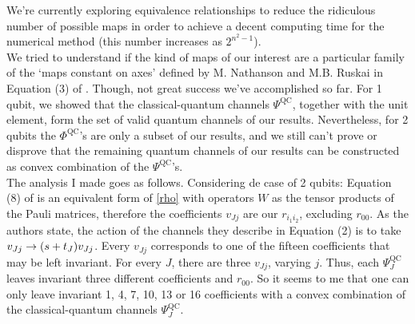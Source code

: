 \documentclass[11pt]{article}
\begin{document}
We're currently exploring equivalence relationships to reduce the ridiculous number of possible maps in order to achieve a
decent computing time for the numerical method (this number increases as $2^{n^2-1}$). \\ 

We tried to understand if the kind of maps of our interest are a particular family of the `maps constant on axes' defined by M.
Nathanson and M.B. Ruskai in Equation (3) of \cite{nathanson2007pauli}. Though, not great success we've accomplished so far.
For 1 qubit, we showed that the classical-quantum channels $\Psi ^{\text{QC}}$, together with the unit element, form the set
of valid quantum channels of our results. Nevertheless, for 2 qubits the $\Phi ^{\text{QC}}$'s are only a subset of our results,
and we still can't prove or disprove that the remaining quantum channels of our results can be constructed as convex
combination of the $\Psi ^{\text{QC}}$'s.\\

The analysis I made goes as follows. Considering de case of 2 qubits: Equation (8) of \cite{nathanson2007pauli} is an
equivalent form of \eqref{rho} with operators $W$ as the tensor products of the Pauli matrices, therefore the coefficients
$v_{Jj}$ are our $r_{i_1i_2}$, excluding $r_{00}$. As the authors state, the action of the channels they describe in Equation (2)
is to take $v_{Jj}\to \qty(s+t_J)v_{Jj}$. Every $v_{Jj}$ corresponds to one of the fifteen coefficients that may be left invariant.
For every $J$, there are three $v_{Jj}$, varying $j$. Thus, each $\Psi ^{\text{QC}}_J$ leaves invariant three different
coefficients and $r_{00}$. So it seems to me that one can only leave invariant 1, 4, 7, 10, 13 or 16 coefficients with a convex
combination of the classical-quantum channels $\Psi ^{\text{QC}}_J$.



\end{document}
